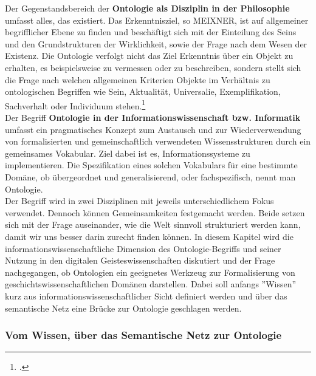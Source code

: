 \documentclass[12pt,a4paper]{article}
\begin{document}
Der Gegenstandsbereich der \textbf{Ontologie als Disziplin in der Philosophie} umfasst alles, das existiert. Das Erkenntnisziel, so MEIXNER, ist auf allgemeiner begrifflicher Ebene zu finden und beschäftigt sich mit der Einteilung des Seins und den Grundstrukturen der Wirklichkeit, sowie der Frage nach dem Wesen der Existenz. Die Ontologie verfolgt nicht das Ziel Erkenntnis über ein Objekt zu erhalten, es beispielsweise zu vermessen oder zu beschreiben, sondern stellt sich die Frage nach welchen allgemeinen Kriterien Objekte im Verhältnis zu ontologischen Begriffen wie Sein, Aktualität, Universalie, Exemplifikation, Sachverhalt oder Individuum stehen.\footcite{meixner1994wissenschaft}
\\
Der Begriff \textbf{Ontologie in der Informationswissenschaft bzw. Informatik} umfasst ein pragmatisches Konzept zum Austausch und zur Wiederverwendung von formalisierten und gemeinschaftlich verwendeten Wissensstrukturen durch ein gemeinsames Vokabular. Ziel dabei ist es, Informationssysteme zu implementieren. Die Spezifikation eines solchen Vokabulars für eine bestimmte Domäne, ob übergeordnet und generalisierend, oder fachspezifisch, nennt man Ontologie.
\\
Der Begriff wird in zwei Disziplinen mit jeweils unterschiedlichem Fokus verwendet. Dennoch können Gemeinsamkeiten festgemacht werden. Beide setzen sich mit der Frage auseinander, wie die Welt sinnvoll strukturiert werden kann, damit wir uns besser darin zurecht finden können. In diesem Kapitel wird die informationswissenschaftliche Dimension des Ontologie-Begriffs und seiner Nutzung in den digitalen Geisteswissenschaften diskutiert und der Frage nachgegangen, ob Ontologien ein geeignetes Werkzeug zur Formalisierung von geschichtswissenschaftlichen Domänen darstellen. Dabei soll anfangs ''Wissen'' kurz aus informationswissenschaftlicher Sicht definiert werden und über das semantische Netz eine Brücke zur Ontologie geschlagen werden. 

\subsubsection{Vom Wissen, über das Semantische Netz zur Ontologie}
\end{document}
